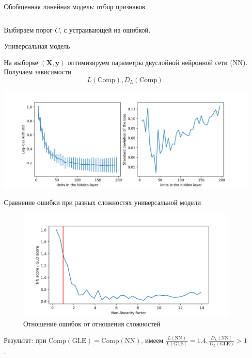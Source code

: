 \documentclass{beamer}
\newcommand{\by}{\mathbf{y}}
\newcommand{\bX}{\mathbf{X}}
\begin{document}
\begin{frame}{Обобщенная линейная модель: отбор признаков}
\begin{columns}
\begin{column}{.5\textwidth}
\begin{center}
            \end{center}
        \end{column}
    \end{columns}
    Выбираем порог $C$, с устраивающей на ошибкой.
\end{frame}


\begin{frame}{Универсальная модель}

    На выборке $(\bX, \by)$ оптимизируем параметры двуслойной нейронной сети ($\mathrm{NN}$).
    Получаем зависимости
    $$
        L(\mathrm{Comp}), D_L(\mathrm{Comp}).
    $$
    \begin{center}
        \includegraphics[width=\textwidth]{../pics/loss_and_std_of_n_units_reg.png}
    \end{center}
\end{frame}


\begin{frame}{Сравнение ошибки при разных сложностях универсальной модели}
    \vspace{-3 mm}
    \begin{figure}[ht]
        \centering
          \includegraphics[width=\textwidth]{../pics/loss_and_std_of_nl_factor.png}
          \caption{Отношение ошибок от отношения сложностей}
    \end{figure}
    Результат: при $\mathrm{Comp}(\mathrm{GLE}) = \mathrm{Comp}(\mathrm{NN})$,
    имеем $\frac{L(\mathrm{NN})}{L(\mathrm{GLE})} = 1.4,
    \frac{D_L(\mathrm{NN})}{D_L(\mathrm{GLE})} > 1$.
\end{frame}
\end{document}
